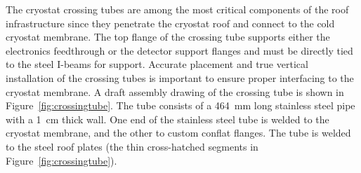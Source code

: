 The cryostat crossing tubes are among the most critical components of the roof infrastructure since  %
they penetrate the cryostat roof and connect to the cold cryostat membrane. The top flange of the crossing tube supports either the electronics feedthrough or the detector support flanges and must be directly tied to the steel I-beams for support. %
Accurate placement and true vertical installation of the crossing tubes is important to ensure proper interfacing to the cryostat membrane. A draft assembly drawing of the crossing tube is shown in Figure~\ref{fig:crossingtube}. The tube consists of a \SI{464}{mm} long stainless steel pipe with a \SI{1}{cm} thick wall. One end of the stainless steel tube is welded to the cryostat membrane, %
and the other to custom conflat flanges. %
The %
tube is welded to the steel roof plates (the thin cross-hatched segments in Figure~\ref{fig:crossingtube}).  


